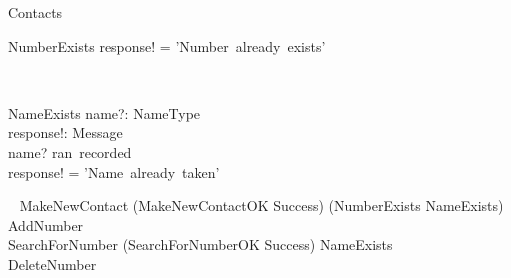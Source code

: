 \begin{class}{Contacts}
\begin{op}{NumberExists}
response! = 'Number~already~exists'
\end{op}\
\zbreak
\begin{op}{NameExists}
name?: NameType \\
response!: Message \\
\ST
name? \in ran~recorded \\
response! = 'Name~already~taken'
\end{op}\
\also
MakeNewContact \sdef (MakeNewContactOK \wedge Success) \oplus (NumberExists \lor NameExists) \\
AddNumber \sdef \\
SearchForNumber \sdef (SearchForNumberOK \wedge Success) \vee \neg NameExists \\
DeleteNumber \sdef
\end{class}